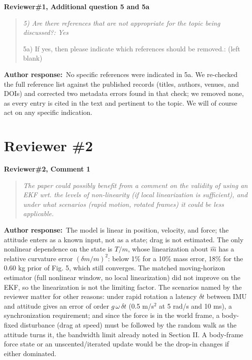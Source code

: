 \documentclass[11pt]{article}
\newcommand{\concern}[1]{\par\medskip\noindent\colorbox{gray!12}{\parbox{\dimexpr\linewidth-2\fboxsep}{\textbf{#1}}}\par\smallskip}
\newcommand{\rlabel}[1]{\par\textbf{#1}\ }
\begin{document}
\concern{Reviewer\#1, Additional question 5 and 5a}

\begin{quote}\itshape 5) Are there references that are not appropriate for the topic being discussed?: Yes\par 5a) If yes, then please indicate which references should be removed.: (left blank)\end{quote}

\rlabel{Author response:}No specific references were indicated in 5a. We re-checked the full reference list against the published records (titles, authors, venues, and DOIs) and corrected two metadata errors found in that check; we removed none, as every entry is cited in the text and pertinent to the topic. We will of course act on any specific indication.

\section*{Reviewer \#2}

\concern{Reviewer\#2, Comment 1}

\begin{quote}\itshape The paper could possibly benefit from a comment on the validity of using an EKF wrt. the levels of non-linearity (if local linearization is sufficient), and under what scenarios (rapid motion, rotated frames) it could be less applicable.\end{quote}

\rlabel{Author response:}The model is linear in position, velocity, and force; the attitude enters as a known input, not as a state; drag is not estimated. The only nonlinear dependence on the state is $T/m$, whose linearization about $\hat m$ has a relative curvature error $(\delta m/m)^2$: below 1\% for a 10\% mass error, 18\% for the 0.60 kg prior of Fig. 5, which still converges. The matched moving-horizon estimator (full nonlinear window, no local linearization) did not improve on the EKF, so the linearization is not the limiting factor. The scenarios named by the reviewer matter for other reasons: under rapid rotation a latency $\delta t$ between IMU and attitude gives an error of order $g\,\omega\,\delta t$ (0.5 m/s$^2$ at 5 rad/s and 10 ms), a synchronization requirement; and since the force is in the world frame, a body-fixed disturbance (drag at speed) must be followed by the random walk as the attitude turns it, the bandwidth limit already noted in Section II. A body-frame force state or an unscented/iterated update would be the drop-in changes if either dominated.
\end{document}
